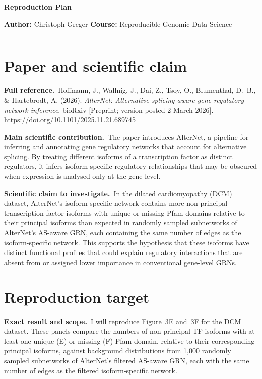 \documentclass[a4paper,11pt]{article}
\newcommand{\field}[2]{\textbf{#1}\ #2\par}
\begin{document}
{\LARGE\bfseries\color{heading} Reproduction Plan}\par
\vspace{2pt}
\textbf{Author:} Christoph Greger
\hfill \textbf{Course:} Reproducible Genomic Data Science\par
\vspace{3pt}
{\color{heading}\hrule}

\section{Paper and scientific claim}

\field{Full reference.}{Hoffmann, J., Wallnig, J., Dai, Z., Tsoy, O., Blumenthal, D.~B., \& Hartebrodt, A. (2026). \textit{AlterNet: Alternative splicing-aware gene regulatory network inference}. bioRxiv [Preprint; version posted 2 March 2026]. \url{https://doi.org/10.1101/2025.11.21.689745}}

\field{Main scientific contribution.}{The paper introduces AlterNet, a pipeline for inferring and annotating gene regulatory networks that account for alternative splicing. By treating different isoforms of a transcription factor as distinct regulators, it infers isoform-specific regulatory relationships that may be obscured when expression is analysed only at the gene level.}

\field{Scientific claim to investigate.}{In the dilated cardiomyopathy (DCM) dataset, AlterNet's isoform-specific network contains more non-principal transcription factor isoforms with unique or missing Pfam domains relative to their principal isoforms than expected in randomly sampled subnetworks of AlterNet's AS-aware GRN, each containing the same number of edges as the isoform-specific network. This supports the hypothesis that these isoforms have distinct functional profiles that could explain regulatory interactions that are absent from or assigned lower importance in conventional gene-level GRNs.}

\section{Reproduction target}

\field{Exact result and scope.}{I will reproduce Figure~3E and~3F for the DCM dataset. These panels compare the numbers of non-principal TF isoforms with at least one unique (E) or missing (F) Pfam domain, relative to their corresponding principal isoforms, against background distributions from 1,000 randomly sampled subnetworks of AlterNet's filtered AS-aware GRN, each with the same number of edges as the filtered isoform-specific network.}
\end{document}

